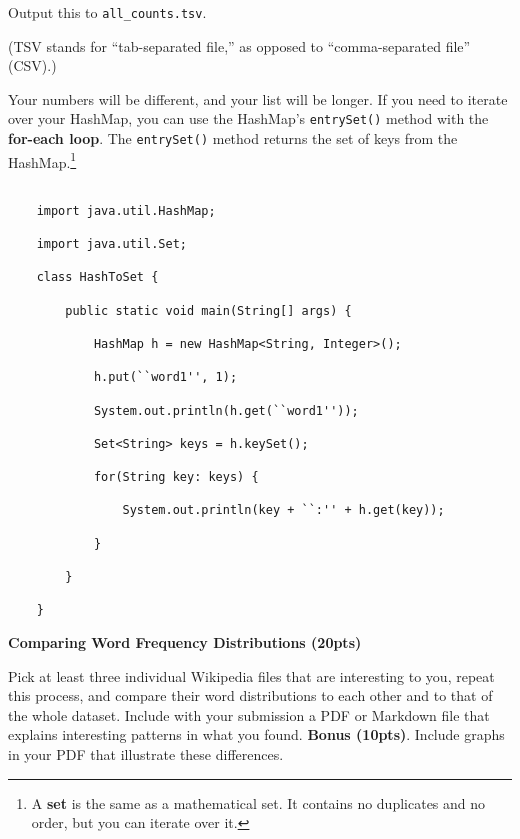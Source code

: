 \documentclass[10pt]{article}
\newenvironment{problem}[2][Problem]{\begin{trivlist}

\item[\hskip \labelsep {\bfseries #1}\hskip \labelsep {\bfseries #2.}]}{\end{trivlist}}
\begin{document}
Output this to \texttt{all\_counts.tsv}.

(TSV stands for ``tab-separated file,'' as opposed to ``comma-separated file'' (CSV).)

Your numbers will be different, and your list will be longer.  If you need to iterate over your HashMap, you can use the HashMap's \texttt{entrySet()} method with the \textbf{for-each loop}.  The \texttt{entrySet()} method returns the set of keys from the HashMap.\footnote{A \textbf{set} is the same as a mathematical set.  It contains no duplicates and no order, but you can iterate over it.}

\begin{verbatim}

    import java.util.HashMap;

    import java.util.Set;

    class HashToSet {

        public static void main(String[] args) {

            HashMap h = new HashMap<String, Integer>();

            h.put(``word1'', 1);

            System.out.println(h.get(``word1''));

            Set<String> keys = h.keySet();

            for(String key: keys) {

                System.out.println(key + ``:'' + h.get(key));

            }

        }

    }

\end{verbatim}



\begin{problem}{Part 4} 

\textbf{Comparing Word Frequency Distributions (20pts)}

Pick at least three individual Wikipedia files that are interesting to you, repeat this process, and compare their word distributions to each other and to that of the whole dataset.  Include with your submission a PDF or Markdown file that explains interesting patterns in what you found.  \textbf{Bonus (10pts)}.  Include graphs in your PDF that illustrate these differences.

\end{problem}
\end{document}
